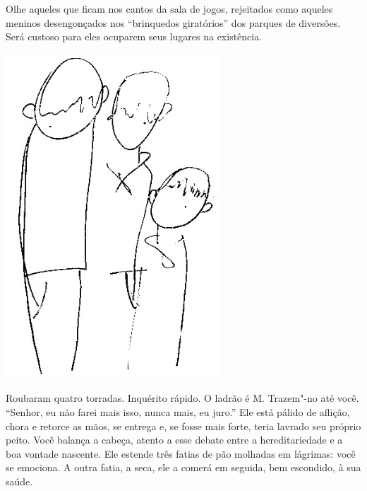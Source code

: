 \bigskip
\bigskip

Olhe aqueles que ficam nos cantos da sala de jogos, rejeitados como
aqueles meninos desengonçados nos ``brinquedos giratórios'' dos parques
de diversões. Será custoso para eles ocuparem seus lugares na
existência.

\bigskip
\bigskip

\pagebreak
\thispagestyle{empty}

\begin{vplace}[.50]
\begin{center}
\includegraphics[width=80mm]{./imgs/Image_6.jpg}
\end{center}
\end{vplace}

\pagebreak


Roubaram quatro torradas. Inquérito rápido. O ladrão é M. Trazem"-no até
você. ``Senhor, eu não farei mais isso, nunca mais, eu juro.'' Ele está
pálido de aflição, chora e retorce as mãos, se entrega e, se fosse mais
forte, teria lavrado seu próprio peito. Você balança a cabeça, atento a
esse debate entre a hereditariedade e a boa vontade nascente. Ele
estende três fatias de pão molhadas em lágrimas: você se emociona. A
outra fatia, a seca, ele a comerá em seguida, bem escondido, à sua
saúde.

